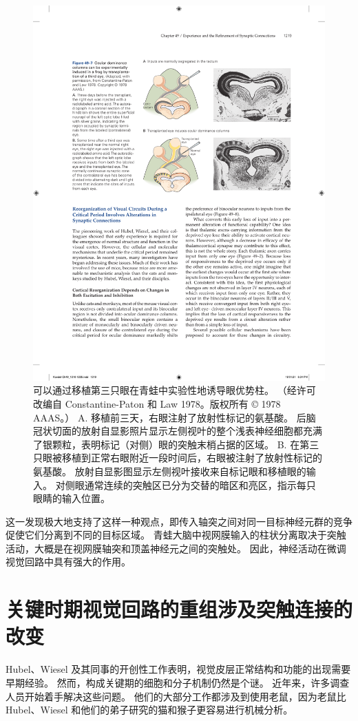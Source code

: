 \begin{figure}[htbp]
	\centering
	\includegraphics[width=0.7\linewidth]{chap49/fig_49_7}
	\caption{可以通过移植第三只眼在青蛙中实验性地诱导眼优势柱。 （经许可改编自 Constantine-Paton 和 Law 1978。版权所有 © 1978 AAAS。） A. 移植前三天，右眼注射了放射性标记的氨基酸。 后脑冠状切面的放射自显影照片显示左侧视叶的整个浅表神经细胞都充满了银颗粒，表明标记（对侧）眼的突触末梢占据的区域。 B. 在第三只眼被移植到正常右眼附近一段时间后，右眼被注射了放射性标记的氨基酸。 放射自显影图显示左侧视叶接收来自标记眼和移植眼的输入。 对侧眼通常连续的突触区已分为交替的暗区和亮区，指示每只眼睛的输入位置。}
	\label{fig:49_7}
\end{figure}

这一发现极大地支持了这样一种观点，即传入轴突之间对同一目标神经元群的竞争促使它们分离到不同的目标区域。 青蛙大脑中视网膜输入的柱状分离取决于突触活动，大概是在视网膜轴突和顶盖神经元之间的突触处。 因此，神经活动在微调视觉回路中具有强大的作用。


\section{关键时期视觉回路的重组涉及突触连接的改变}
Hubel、Wiesel 及其同事的开创性工作表明，视觉皮层正常结构和功能的出现需要早期经验。 然而，构成关键期的细胞和分子机制仍然是个谜。 近年来，许多调查人员开始着手解决这些问题。 他们的大部分工作都涉及到使用老鼠，因为老鼠比 Hubel、Wiesel 和他们的弟子研究的猫和猴子更容易进行机械分析。

